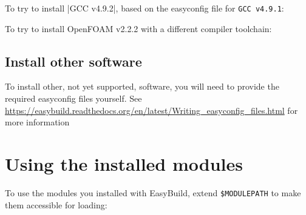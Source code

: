 To try to install \lstinliline|GCC v4.9.2|, based on the easyconfig file for \lstinline|GCC v4.9.1|:

\begin{prompt}
\end{prompt}

To try to install OpenFOAM v2.2.2 with a different compiler toolchain:

\begin{prompt}
\end{prompt}

\subsection{Install other software}

To install other, not yet supported, software, you will need to provide the required
easyconfig files yourself. See \url{https://easybuild.readthedocs.org/en/latest/Writing_easyconfig_files.html}
for more information

\section{Using the installed modules}

To use the modules you installed with EasyBuild, extend \lstinline|$MODULEPATH|
to make them accessible for loading:

